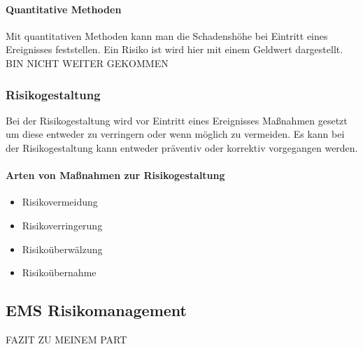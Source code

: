\paragraph{Quantitative Methoden}
Mit quantitativen Methoden kann man die Schadenshöhe bei Eintritt eines Ereignisses feststellen. Ein Risiko ist wird hier mit einem Geldwert dargestellt.
BIN NICHT WEITER GEKOMMEN

\subsubsection{Risikogestaltung}
Bei der Risikogestaltung wird vor Eintritt eines Ereignisses Maßnahmen gesetzt um diese entweder zu verringern oder wenn möglich zu vermeiden.
Es kann bei der Risikogestaltung kann entweder präventiv oder korrektiv vorgegangen werden.

\paragraph{Arten von Maßnahmen zur Risikogestaltung}
\begin{itemize}
	\item Risikovermeidung
	\item Risikoverringerung
	\item Risikoüberwälzung
	\item Risikoübernahme
\end{itemize}



\subsection{EMS Risikomanagement}
FAZIT ZU MEINEM PART